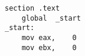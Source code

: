 \begin{lstlisting}[caption={{\ttfamily sort.s}},label={src:sort}]
    section .text
    global  _start
_start:
    mov eax,    0
    mov ebx,    0
\end{lstlisting}